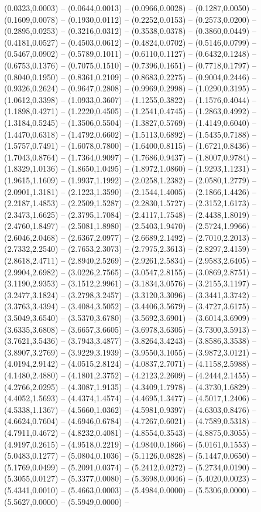  (0.0323,0.0003) -- (0.0644,0.0013) -- (0.0966,0.0028) -- (0.1287,0.0050) -- (0.1609,0.0078) -- (0.1930,0.0112) -- (0.2252,0.0153) -- (0.2573,0.0200) -- (0.2895,0.0253) -- (0.3216,0.0312) -- (0.3538,0.0378) -- (0.3860,0.0449) -- (0.4181,0.0527) -- (0.4503,0.0612) -- (0.4824,0.0702) -- (0.5146,0.0799) -- (0.5467,0.0902) -- (0.5789,0.1011) -- (0.6110,0.1127) -- (0.6432,0.1248) -- (0.6753,0.1376) -- (0.7075,0.1510) -- (0.7396,0.1651) -- (0.7718,0.1797) -- (0.8040,0.1950) -- (0.8361,0.2109) -- (0.8683,0.2275) -- (0.9004,0.2446) -- (0.9326,0.2624) -- (0.9647,0.2808) -- (0.9969,0.2998) -- (1.0290,0.3195) -- (1.0612,0.3398) -- (1.0933,0.3607) -- (1.1255,0.3822) -- (1.1576,0.4044) -- (1.1898,0.4271) -- (1.2220,0.4505) -- (1.2541,0.4745) -- (1.2863,0.4992) -- (1.3184,0.5245) -- (1.3506,0.5504) -- (1.3827,0.5769) -- (1.4149,0.6040) -- (1.4470,0.6318) -- (1.4792,0.6602) -- (1.5113,0.6892) -- (1.5435,0.7188) -- (1.5757,0.7491) -- (1.6078,0.7800) -- (1.6400,0.8115) -- (1.6721,0.8436) -- (1.7043,0.8764) -- (1.7364,0.9097) -- (1.7686,0.9437) -- (1.8007,0.9784) -- (1.8329,1.0136) -- (1.8650,1.0495) -- (1.8972,1.0860) -- (1.9293,1.1231) -- (1.9615,1.1609) -- (1.9937,1.1992) -- (2.0258,1.2382) -- (2.0580,1.2779) -- (2.0901,1.3181) -- (2.1223,1.3590) -- (2.1544,1.4005) -- (2.1866,1.4426) -- (2.2187,1.4853) -- (2.2509,1.5287) -- (2.2830,1.5727) -- (2.3152,1.6173) -- (2.3473,1.6625) -- (2.3795,1.7084) -- (2.4117,1.7548) -- (2.4438,1.8019) -- (2.4760,1.8497) -- (2.5081,1.8980) -- (2.5403,1.9470) -- (2.5724,1.9966) -- (2.6046,2.0468) -- (2.6367,2.0977) -- (2.6689,2.1492) -- (2.7010,2.2013) -- (2.7332,2.2540) -- (2.7653,2.3073) -- (2.7975,2.3613) -- (2.8297,2.4159) -- (2.8618,2.4711) -- (2.8940,2.5269) -- (2.9261,2.5834) -- (2.9583,2.6405) -- (2.9904,2.6982) -- (3.0226,2.7565) -- (3.0547,2.8155) -- (3.0869,2.8751) -- (3.1190,2.9353) -- (3.1512,2.9961) -- (3.1834,3.0576) -- (3.2155,3.1197) -- (3.2477,3.1824) -- (3.2798,3.2457) -- (3.3120,3.3096) -- (3.3441,3.3742) -- (3.3763,3.4394) -- (3.4084,3.5052) -- (3.4406,3.5679) -- (3.4727,3.6175) -- (3.5049,3.6540) -- (3.5370,3.6780) -- (3.5692,3.6901) -- (3.6014,3.6909) -- (3.6335,3.6808) -- (3.6657,3.6605) -- (3.6978,3.6305) -- (3.7300,3.5913) -- (3.7621,3.5436) -- (3.7943,3.4877) -- (3.8264,3.4243) -- (3.8586,3.3538) -- (3.8907,3.2769) -- (3.9229,3.1939) -- (3.9550,3.1055) -- (3.9872,3.0121) -- (4.0194,2.9142) -- (4.0515,2.8124) -- (4.0837,2.7071) -- (4.1158,2.5988) -- (4.1480,2.4880) -- (4.1801,2.3752) -- (4.2123,2.2609) -- (4.2444,2.1455) -- (4.2766,2.0295) -- (4.3087,1.9135) -- (4.3409,1.7978) -- (4.3730,1.6829) -- (4.4052,1.5693) -- (4.4374,1.4574) -- (4.4695,1.3477) -- (4.5017,1.2406) -- (4.5338,1.1367) -- (4.5660,1.0362) -- (4.5981,0.9397) -- (4.6303,0.8476) -- (4.6624,0.7604) -- (4.6946,0.6784) -- (4.7267,0.6021) -- (4.7589,0.5318) -- (4.7911,0.4672) -- (4.8232,0.4081) -- (4.8554,0.3543) -- (4.8875,0.3055) -- (4.9197,0.2615) -- (4.9518,0.2219) -- (4.9840,0.1866) -- (5.0161,0.1553) -- (5.0483,0.1277) -- (5.0804,0.1036) -- (5.1126,0.0828) -- (5.1447,0.0650) -- (5.1769,0.0499) -- (5.2091,0.0374) -- (5.2412,0.0272) -- (5.2734,0.0190) -- (5.3055,0.0127) -- (5.3377,0.0080) -- (5.3698,0.0046) -- (5.4020,0.0023) -- (5.4341,0.0010) -- (5.4663,0.0003) -- (5.4984,0.0000) -- (5.5306,0.0000) -- (5.5627,0.0000) -- (5.5949,0.0000) -- 